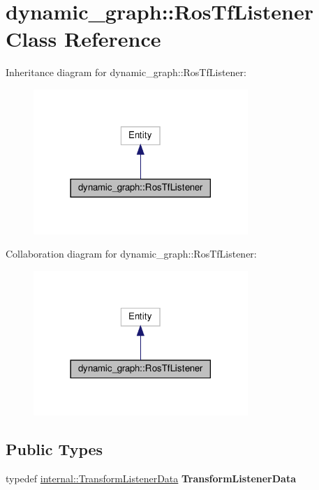\hypertarget{classdynamic__graph_1_1RosTfListener}{}\section{dynamic\+\_\+graph\+:\+:Ros\+Tf\+Listener Class Reference}
\label{classdynamic__graph_1_1RosTfListener}


Inheritance diagram for dynamic\+\_\+graph\+:\+:Ros\+Tf\+Listener\+:
\nopagebreak
\begin{figure}[H]
\begin{center}
\leavevmode
\includegraphics[width=230pt]{classdynamic__graph_1_1RosTfListener__inherit__graph}
\end{center}
\end{figure}


Collaboration diagram for dynamic\+\_\+graph\+:\+:Ros\+Tf\+Listener\+:
\nopagebreak
\begin{figure}[H]
\begin{center}
\leavevmode
\includegraphics[width=230pt]{classdynamic__graph_1_1RosTfListener__coll__graph}
\end{center}
\end{figure}
\subsection*{Public Types}
\begin{DoxyCompactItemize}
\item 
\mbox{\label{classdynamic__graph_1_1RosTfListener_acdd29e75471c27a6c4d412781254352f}} 
typedef \hyperlink{structdynamic__graph_1_1internal_1_1TransformListenerData}{internal\+::\+Transform\+Listener\+Data} {\bfseries Transform\+Listener\+Data}
\end{DoxyCompactItemize}
